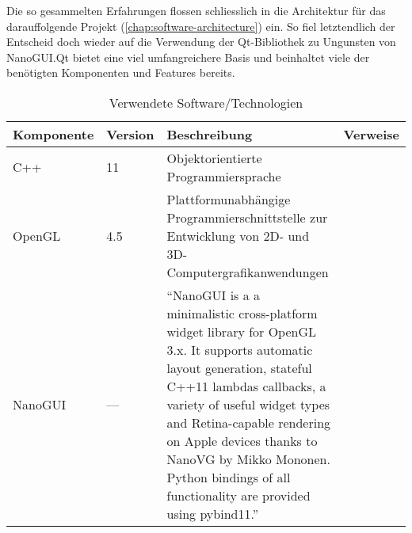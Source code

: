 Die so gesammelten Erfahrungen flossen schliesslich in die Architektur für das
darauffolgende Projekt (\ref{chap:software-architecture}) ein. So fiel
letztendlich der Entscheid doch wieder auf die Verwendung der Qt-Bibliothek zu
Ungunsten von NanoGUI.\@ Qt bietet eine viel umfangreichere Basis und beinhaltet
viele der benötigten Komponenten und Features bereits.


\begin{longtabu}{p{0.2\textwidth}p{0.1\textwidth}p{0.6\textwidth}p{0.1\textwidth}}
    \caption{Verwendete
        Software/Technologien}\label{table:prototype:software}\\
    \toprule
    \textbf{Komponente} & \textbf{Version} & \textbf{Beschreibung} & \textbf{Verweise} \\
    \midrule
    C++        & 11      & Objektorientierte Programmiersprache
                           & \protect\footnotemark{}\\

    OpenGL     & 4.5     & Plattformunabhängige Programmierschnittstelle zur
                           Entwicklung von 2D- und 3D-Computergrafikanwendungen
                           \parencite{wikipedia_the_free_encyclopedia_opengl_2015}
                           &\protect\footnotemark{}\\

    NanoGUI    & ---     & ``NanoGUI is a a minimalistic cross-platform widget
                             library for OpenGL 3.x. It supports automatic
                             layout generation, stateful C++11 lambdas
                             callbacks, a variety of useful widget types and
                             Retina-capable rendering on Apple devices thanks
                             to NanoVG by Mikko Mononen. Python bindings of all
                             functionality are provided using
                             pybind11.''~\parencite{jakob_wenzel_wjakob/nanogui:_2016}
                           &\protect\footnotemark{}\\


\end{longtabu}
